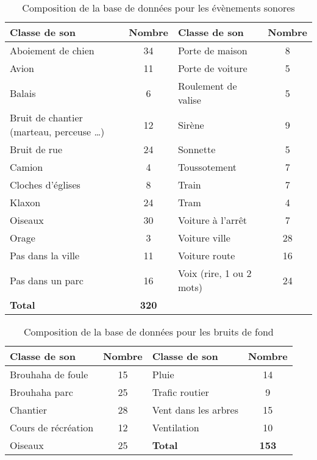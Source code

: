 \begin{table}[h]
\centering
\begin{tabular}{m{5cm} c |m{5cm} c}
\hline
\toprule
\textbf{Classe de son} & \textbf{Nombre} & \textbf{Classe de son} & \textbf{Nombre} \\
\midrule
Aboiement de chien & 34 & Porte de maison & 8\\ 
\rowcolor[HTML]{C0C0C0}
Avion & 11 &  Porte de voiture & 5\\ 
Balais & 6 & Roulement de valise & 5\\ 
\rowcolor[HTML]{C0C0C0}
Bruit de chantier (marteau, perceuse \dots) & 12 &  Sirène & 9 \\ 
Bruit de rue & 24 & Sonnette & 5\\ 
\rowcolor[HTML]{C0C0C0}
Camion & 4 & Toussotement & 7 \\ 
Cloches d'églises & 8 & Train & 7\\
\rowcolor[HTML]{C0C0C0}
Klaxon & 24 &  Tram & 4 \\ 
Oiseaux & 30 &  Voiture à l'arrêt & 7\\ 
\rowcolor[HTML]{C0C0C0}
Orage & 3 &  Voiture ville & 28\\ 
Pas dans la ville & 11 & Voiture route & 16 \\
\rowcolor[HTML]{C0C0C0}
Pas dans un parc & 16 &  Voix (rire, 1 ou 2 mots) & 24 \\ 
\textbf{Total} & \textbf{320}\\
\bottomrule
\end{tabular}
\caption{Composition de la base de données pour les évènements sonores}
\label{tab:dataBaseEv}
\end{table}



\begin{table}[h]
\centering
\begin{tabular}{m{5cm} c |m{5cm} c}
\toprule
\textbf{Classe de son} & \textbf{Nombre} & \textbf{Classe de son} & \textbf{Nombre} \\ \midrule
Brouhaha de foule & 15 & Pluie & 14 \\ 
\rowcolor[HTML]{C0C0C0}
Brouhaha parc & 25 & Trafic routier & 9 \\
Chantier & 28 & Vent dans les arbres & 15 \\ 
\rowcolor[HTML]{C0C0C0}
Cours de récréation & 12 & Ventilation & 10 \\ 
Oiseaux & 25 & \textbf{Total} & \textbf{153} \\ 
\bottomrule
\end{tabular}
\caption{Composition de la base de données pour les bruits de fond}
\label{tab:dataBaseBcg}
\end{table}
